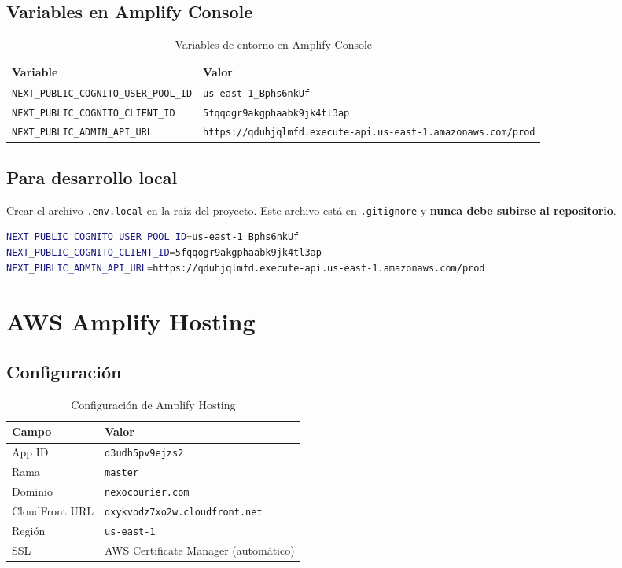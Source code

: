 \documentclass[12pt,a4paper]{article}
\begin{document}
\subsection{Variables en Amplify Console}

\begin{table}[H]
\centering
\begin{tabular}{@{}ll@{}}
\toprule
\textbf{Variable} & \textbf{Valor} \\
\midrule
\texttt{NEXT\_PUBLIC\_COGNITO\_USER\_POOL\_ID} & \texttt{us-east-1\_Bphs6nkUf} \\
\texttt{NEXT\_PUBLIC\_COGNITO\_CLIENT\_ID} & \texttt{5fqqogr9akgphaabk9jk4tl3ap} \\
\texttt{NEXT\_PUBLIC\_ADMIN\_API\_URL} & \texttt{https://qduhjqlmfd.execute-api.us-east-1.amazonaws.com/prod} \\
\bottomrule
\end{tabular}
\caption{Variables de entorno en Amplify Console}
\end{table}

\subsection{Para desarrollo local}

Crear el archivo \texttt{.env.local} en la raíz del proyecto. Este archivo está en
\texttt{.gitignore} y \textbf{nunca debe subirse al repositorio}.

\begin{lstlisting}[language=bash, caption={.env.local --- solo para desarrollo}]
NEXT_PUBLIC_COGNITO_USER_POOL_ID=us-east-1_Bphs6nkUf
NEXT_PUBLIC_COGNITO_CLIENT_ID=5fqqogr9akgphaabk9jk4tl3ap
NEXT_PUBLIC_ADMIN_API_URL=https://qduhjqlmfd.execute-api.us-east-1.amazonaws.com/prod
\end{lstlisting}

\section{AWS Amplify Hosting}

\subsection{Configuración}

\begin{table}[H]
\centering
\begin{tabular}{@{}ll@{}}
\toprule
\textbf{Campo} & \textbf{Valor} \\
\midrule
App ID & \texttt{d3udh5pv9ejzs2} \\
Rama & \texttt{master} \\
Dominio & \texttt{nexocourier.com} \\
CloudFront URL & \texttt{dxykvodz7xo2w.cloudfront.net} \\
Región & \texttt{us-east-1} \\
SSL & AWS Certificate Manager (automático) \\
\bottomrule
\end{tabular}
\caption{Configuración de Amplify Hosting}
\end{table}
\end{document}
